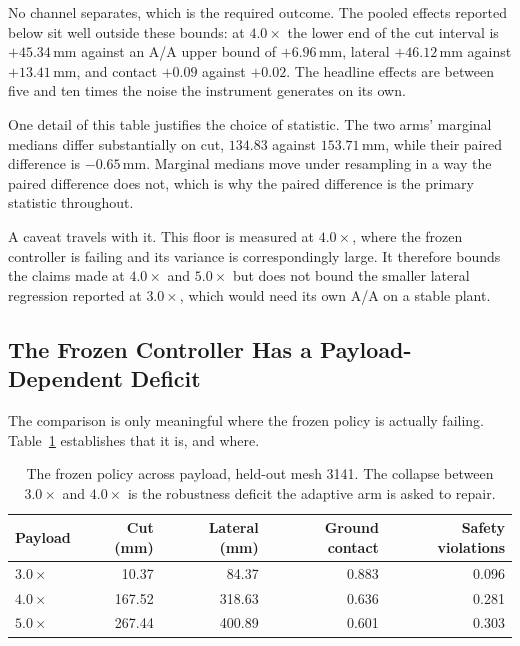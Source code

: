 No channel separates, which is the required outcome. The pooled effects reported
below sit well outside these bounds: at $4.0\times$ the lower end of the cut
interval is $+45.34\,$mm against an A/A upper bound of $+6.96\,$mm, lateral
$+46.12\,$mm against $+13.41\,$mm, and contact $+0.09$ against $+0.02$. The
headline effects are between five and ten times the noise the instrument
generates on its own.

One detail of this table justifies the choice of statistic. The two arms'
marginal medians differ substantially on cut, $134.83$ against $153.71\,$mm,
while their paired difference is $-0.65\,$mm. Marginal medians move under
resampling in a way the paired difference does not, which is why the paired
difference is the primary statistic throughout.

A caveat travels with it. This floor is measured at $4.0\times$, where the
frozen controller is failing and its variance is correspondingly large. It
therefore bounds the claims made at $4.0\times$ and $5.0\times$ but does not
bound the smaller lateral regression reported at $3.0\times$, which would need
its own A/A on a stable plant.

\subsection{The Frozen Controller Has a Payload-Dependent Deficit}

The comparison is only meaningful where the frozen policy is actually failing.
Table~\ref{tab:eval:frozen-deficit} establishes that it is, and where.

\begin{table}[H]
  \centering
  \caption{The frozen policy across payload, held-out mesh 3141. The collapse
  between $3.0\times$ and $4.0\times$ is the robustness deficit the adaptive arm
  is asked to repair.}
  \label{tab:eval:frozen-deficit}
  \small
  \begin{tabular}{@{}lrrrr@{}}
    \toprule
    Payload & Cut (mm) & Lateral (mm) & Ground contact & Safety violations \\
    \midrule
    $3.0\times$ &  10.37 &  84.37 & 0.883 & 0.096 \\
    $4.0\times$ & 167.52 & 318.63 & 0.636 & 0.281 \\
    $5.0\times$ & 267.44 & 400.89 & 0.601 & 0.303 \\
    \bottomrule
  \end{tabular}
\end{table}


